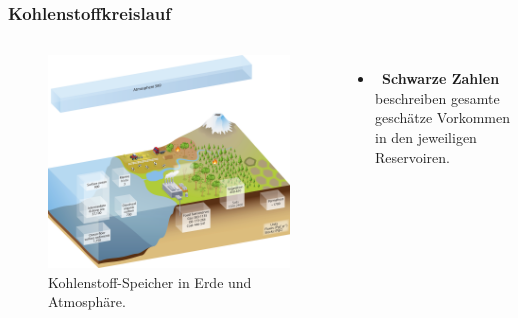 \begin{frame}
	\frametitle{Kohlenstoffkreislauf}
	\begin{columns}
		\begin{figure}
			\centering
			\includegraphics[width=0.9\linewidth]{bilder/kohlenstoff/cycle_reservoirs.png}
			\caption{Kohlenstoff-Speicher in Erde und Atmosphäre.}
		\end{figure}
		\begin{itemize}
			\item [] \textbf{Schwarze Zahlen} beschreiben gesamte geschätze Vorkommen in den jeweiligen Reservoiren.
		\end{itemize}

	\end{columns}

\end{frame}



